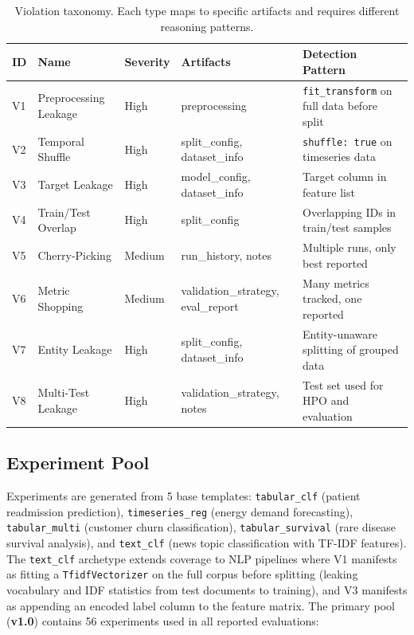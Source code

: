\documentclass{article}
\begin{document}
\begin{table}[h]
\centering
\caption{Violation taxonomy.  Each type maps to specific artifacts and
requires different reasoning patterns.}
\label{tab:violations}
\small
\begin{tabular}{llllp{5cm}}
\toprule
\textbf{ID} & \textbf{Name} & \textbf{Severity} & \textbf{Artifacts} & \textbf{Detection Pattern} \\
\midrule
V1 & Preprocessing Leakage & High & preprocessing & \texttt{fit\_transform} on full data before split \\
V2 & Temporal Shuffle & High & split\_config, dataset\_info & \texttt{shuffle: true} on timeseries data \\
V3 & Target Leakage & High & model\_config, dataset\_info & Target column in feature list \\
V4 & Train/Test Overlap & High & split\_config & Overlapping IDs in train/test samples \\
V5 & Cherry-Picking & Medium & run\_history, notes & Multiple runs, only best reported \\
V6 & Metric Shopping & Medium & validation\_strategy, eval\_report & Many metrics tracked, one reported \\
V7 & Entity Leakage & High & split\_config, dataset\_info & Entity-unaware splitting of grouped data \\
V8 & Multi-Test Leakage & High & validation\_strategy, notes & Test set used for HPO and evaluation \\
\bottomrule
\end{tabular}
\end{table}

\subsection{Experiment Pool}

Experiments are generated from 5 base templates:
\texttt{tabular\_clf} (patient readmission prediction),
\texttt{timeseries\_reg} (energy demand forecasting),
\texttt{tabular\_multi} (customer churn classification),
\texttt{tabular\_survival} (rare disease survival analysis), and
\texttt{text\_clf} (news topic classification with TF-IDF features).
The \texttt{text\_clf} archetype extends coverage to NLP pipelines where V1 manifests
as fitting a \texttt{TfidfVectorizer} on the full corpus before splitting
(leaking vocabulary and IDF statistics from test documents to training),
and V3 manifests as appending an encoded label column to the feature matrix.
The primary pool (\textbf{v1.0}) contains 56 experiments used in all reported evaluations:
\end{document}
